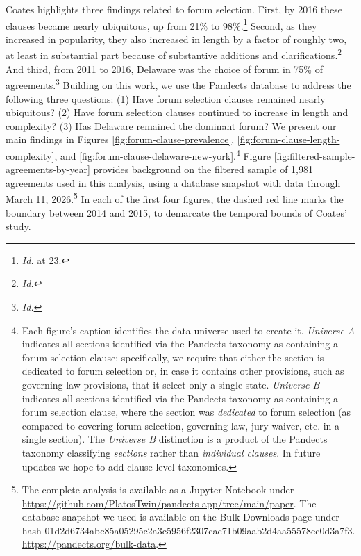 \documentclass[12pt]{article}
\begin{document}
{Coates highlights three findings related to forum selection. First, by 2016 these clauses became nearly ubiquitous, up from 21\% to 98\%.\footnote{\emph{Id.} at 23.} Second, as they increased in popularity, they also increased in length by a factor of roughly two, at least in substantial part because of substantive additions and clarifications.\footnote{\emph{Id.}} And third, from 2011 to 2016, Delaware was the choice of forum in 75\% of agreements.\footnote{\emph{Id.}} Building on this work, we use the Pandects database to address the following three questions: (1) Have forum selection clauses remained nearly ubiquitous? (2) Have forum selection clauses continued to increase in length and complexity? (3) Has Delaware remained the dominant forum? We present our main findings in Figures \ref{fig:forum-clause-prevalence}, \ref{fig:forum-clause-length-complexity}, and \ref{fig:forum-clause-delaware-new-york}.\footnote{Each figure's caption identifies the data universe used to create it. \emph{Universe A} indicates all sections identified via the Pandects taxonomy as containing a forum selection clause; specifically, we require that either the section is dedicated to forum selection or, in case it contains other provisions, such as governing law provisions, that it select only a single state. \emph{Universe B} indicates all sections identified via the Pandects taxonomy as containing a forum selection clause, where the section was \emph{dedicated} to forum selection (as compared to covering forum selection, governing law, jury waiver, etc. in a single section). The \emph{Universe B} distinction is a product of the Pandects taxonomy classifying \emph{sections} rather than \emph{individual clauses}. In future updates we hope to add clause-level taxonomies.} Figure \ref{fig:filtered-sample-agreements-by-year} provides background on the filtered sample of 1,981 agreements used in this analysis, using a database snapshot with data through March 11, 2026.\footnote{The complete analysis is available as a Jupyter Notebook under \url{https://github.com/PlatosTwin/pandects-app/tree/main/paper}. The database snapshot we used is available on the Bulk Downloads page under hash 01d2d6734abc85a05295c2a3c5956f2307cac71b09aab2d4aa55578ec0d3a7f3. \url{https://pandects.org/bulk-data}.} In each of the first four figures, the dashed red line marks the boundary between 2014 and 2015, to demarcate the temporal bounds of Coates' study.

}
\end{document}

